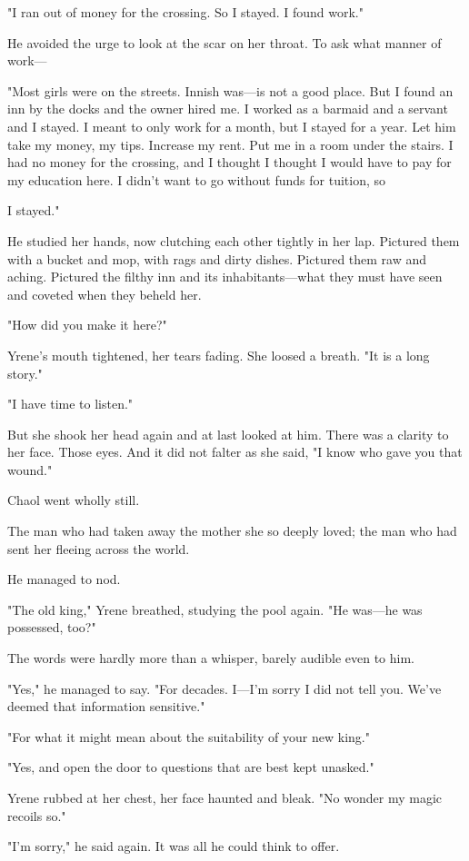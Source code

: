 "I ran out of money for the crossing. So I stayed. I found work."

He avoided the urge to look at the scar on her throat. To ask what manner of work---

"Most girls were on the streets. Innish was---is not a good place. But I found an inn by the docks and the owner hired me. I worked as a barmaid and a servant and  I stayed. I meant to only work for a month, but I stayed for a year. Let him take my money, my tips. Increase my rent. Put me in a room under the stairs. I had no money for the crossing, and I thought  I thought I would have to pay for my education here. I didn't want to go without funds for tuition, so


I stayed."

He studied her hands, now clutching each other tightly in her lap. Pictured them with a bucket and mop, with rags and dirty dishes. Pictured them raw and aching. Pictured the filthy inn and its inhabitants---what they must have seen and coveted when they beheld her.

"How did you make it here?"

Yrene's mouth tightened, her tears fading. She loosed a breath. "It is a long story."

"I have time to listen."

But she shook her head again and at last looked at him. There was a
 clarity to her face. Those eyes. And it did not falter as she said, "I know who gave you that wound."

Chaol went wholly still.

The man who had taken away the mother she so deeply loved; the man who had sent her fleeing across the world.

He managed to nod.

"The old king," Yrene breathed, studying the pool again. "He was---he was possessed, too?"

The words were hardly more than a whisper, barely audible even to him.

"Yes," he managed to say. "For decades. I---I'm sorry I did not tell you. We've deemed that information  sensitive."

"For what it might mean about the suitability of your new king."

"Yes, and open the door to questions that are best kept unasked."

Yrene rubbed at her chest, her face haunted and bleak. "No wonder my magic recoils so."

"I'm sorry," he said again. It was all he could think to offer.

